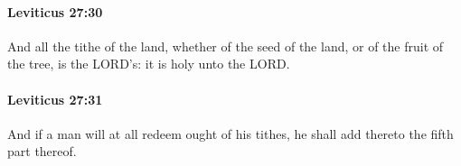 		\paragraph{Leviticus 27:30} %
			\label{LEVITICUS-27-30}

			And all the tithe of the land, whether of the seed of the land, or of the fruit of the tree, is the LORD’s: it is holy unto the LORD.


		\paragraph{Leviticus 27:31} %
			\label{LEVITICUS-27-31}

			And if a man will at all redeem ought of his tithes, he shall add thereto the fifth part thereof.


